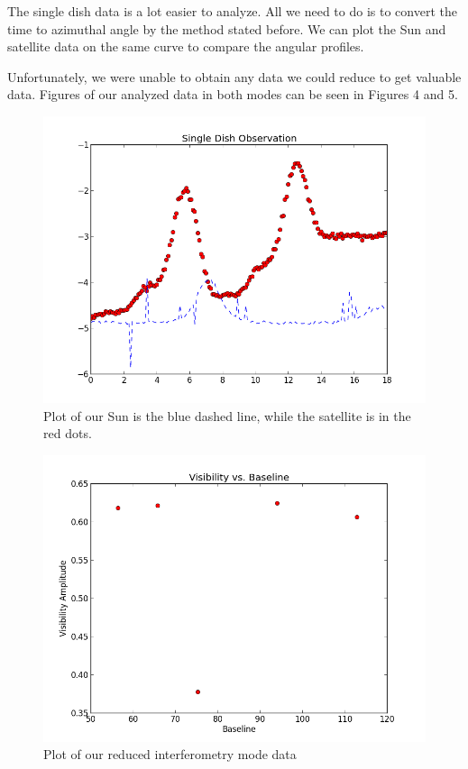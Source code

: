 \documentclass{aastex61}
\begin{document}
The single dish data is a lot easier to analyze. All we need to do is to convert the time to azimuthal angle by the method stated before. We can plot the Sun and satellite data on the same curve to compare the angular profiles.

Unfortunately, we were unable to obtain any data we could reduce to get valuable data. Figures of our analyzed data in both modes can be seen in Figures 4 and 5.
\begin{figure}[hbt!]
	\centering
	\includegraphics[scale = .45]{qqq.png}
	\caption{Plot of our Sun is the blue dashed line, while the satellite is in the red dots.}
	\label{fig: refcurve1}
\end{figure}
\begin{figure}[hbt!]
	\centering
	\includegraphics[scale = .45]{figure_1.png}
	\caption{Plot of our reduced interferometry mode data}
	\label{fig: refcurve1}
\end{figure}
\end{document}
